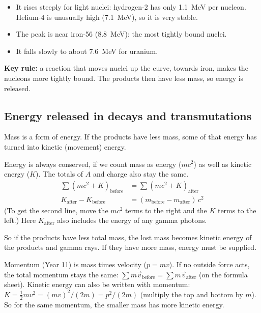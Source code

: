 \begin{itemize}
  \item It rises steeply for light nuclei: hydrogen-2 has only \qty{1.1}{MeV} per
        nucleon. Helium-4 is unusually high (\qty{7.1}{MeV}), so it is very stable.
  \item The peak is near iron-56 (\qty{8.8}{MeV}): the most tightly bound nuclei.
  \item It falls slowly to about \qty{7.6}{MeV} for uranium.
\end{itemize}
\textbf{Key rule:} a reaction that moves nuclei up the curve, towards iron, makes the
nucleons more tightly bound. The products then have less mass, so energy is released.

\subsection{Energy released in decays and transmutations}

Mass is a form of energy. If the products have less mass, some of that energy has
turned into kinetic (movement) energy.

Energy is always conserved, if we count mass as energy ($mc^2$) as well as kinetic
energy ($K$). The totals of $A$ and charge also stay the same.
\begin{align*}
  \textstyle\sum (mc^2 + K)_\mathrm{before} &= \textstyle\sum (mc^2 + K)_\mathrm{after}\\
  K_\mathrm{after} - K_\mathrm{before} &= (m_\mathrm{before} - m_\mathrm{after})\,c^2
\end{align*}
(To get the second line, move the $mc^2$ terms to the right and the $K$ terms to the
left.) Here $K_\mathrm{after}$ also includes the energy of any gamma photons.

So if the products have less total mass, the lost mass becomes kinetic energy of the
products and gamma rays. If they have more mass, energy must be supplied.

\begin{refresher}{Momentum (Year 11)}
 is mass times velocity ($p = mv$). If no outside force acts, the
total momentum stays the same: $\sum m\vec{v}_\mathrm{before} = \sum
m\vec{v}_\mathrm{after}$ (on the formula sheet). Kinetic energy can also be written
with momentum: $K = \tfrac12 mv^2 = (mv)^2/(2m) = p^2/(2m)$ (multiply the top and
bottom by $m$). So for the same momentum, the smaller mass has more kinetic energy.
\end{refresher}

